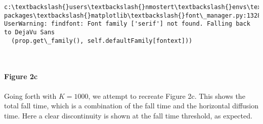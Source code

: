 \documentclass[11pt]{article}
\begin{document}
    \begin{Verbatim}[commandchars=\\\{\}]
c:\textbackslash{}users\textbackslash{}nmostert\textbackslash{}envs\textbackslash{}spew\textbackslash{}lib\textbackslash{}site-packages\textbackslash{}matplotlib\textbackslash{}font\_manager.py:1328: UserWarning: findfont: Font family ['serif'] not found. Falling back to DejaVu Sans
  (prop.get\_family(), self.defaultFamily[fontext]))

    \end{Verbatim}

    \begin{center}
    \end{center}
    { \hspace*{\fill} \\}
    
    \paragraph{Figure 2c}\label{figure-2c}

Going forth with \(K=1000\), we attempt to recreate Figure 2c. This
shows the total fall time, which is a combination of the fall time and
the horizontal diffusion time. Here a clear discontinuity is shown at
the fall time threshold, as expected.
\end{document}
